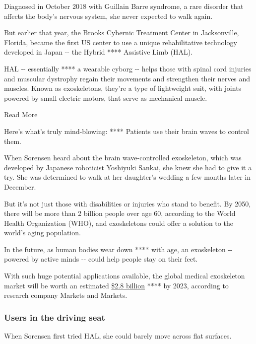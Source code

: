 Diagnosed in October 2018 with Guillain Barre syndrome, a rare disorder
that affects the body's nervous system, she never expected to walk
again.

But earlier that year, the Brooks Cybernic Treatment Center in
Jacksonville, Florida, became the first US center to use a unique
rehabilitative technology developed in Japan -\/- the Hybrid ****
Assistive Limb (HAL).

HAL -\/- essentially **** a wearable cyborg -\/- helps those with spinal
cord injuries and muscular dystrophy regain their movements and
strengthen their nerves and muscles. Known as exoskeletons, they're a
type of lightweight suit, with joints powered by small electric motors,
that serve as mechanical muscle.

Read More

Here's what's truly mind-blowing: **** Patients use their brain waves to
control them.

When Sorensen heard about the brain wave-controlled exoskeleton, which
was developed by Japanese roboticist Yoshiyuki Sankai, she knew she had
to give it a try. She was determined to walk at her daughter's wedding a
few months later in December.

But it's not just those with disabilities or injuries who stand to
benefit. By 2050, there will be more than 2 billion people over age 60,
according to the World Health Organization (WHO), and exoskeletons could
offer a solution to the world's aging population.

In the future, as human bodies wear down **** with age, an exoskeleton
-\/- powered by active minds -\/- could help people stay on their feet.

With such huge potential applications available, the global medical
exoskeleton market will be worth an estimated
\href{https://www.marketsandmarkets.com/Market-Reports/exoskeleton-market-40697797.html?gclid=CjwKCAjw-ITqBRB7EiwAZ1c5U1B09BUZvY3qsQn9QB30eSCM_z7x3LMKCiWNLvxfSsmBGqdezQYLBBoCM0kQAvD_BwE}{\$2.8
billion} **** by 2023, according to research company Markets and
Markets.

\hypertarget{users-in-the-driving-seat}{%
\subsubsection{Users in the driving
seat}\label{users-in-the-driving-seat}}

When Sorensen first tried HAL, she could barely move across flat
surfaces.

